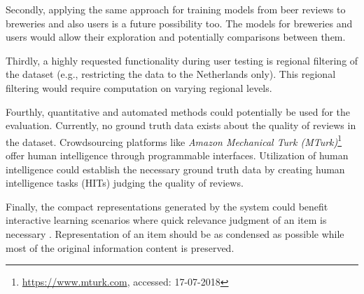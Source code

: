 Secondly, applying the same approach for training models from beer reviews to breweries and also users is a future possibility too.
The models for breweries and users would allow their exploration and potentially comparisons between them.

Thirdly, a highly requested functionality during user testing is regional filtering of the dataset (e.g., restricting the data to the Netherlands only).
This regional filtering would require computation on varying regional levels.

Fourthly, quantitative and automated methods could potentially be used for the evaluation.
Currently, no ground truth data exists about the quality of reviews in the dataset.
Crowdsourcing platforms like \textit{Amazon Mechanical Turk (MTurk)}\footnote{\url{https://www.mturk.com}, accessed: 17-07-2018} offer human intelligence through programmable interfaces.
Utilization of human intelligence could establish the necessary ground truth data by creating human intelligence tasks (HITs) judging the quality of reviews.

Finally, the compact representations generated by the system could benefit interactive learning scenarios where quick relevance judgment of an item is necessary \cite{Zahalka2015, Zahalka2018}.
Representation of an item should be as condensed as possible while most of the original information content is preserved.
